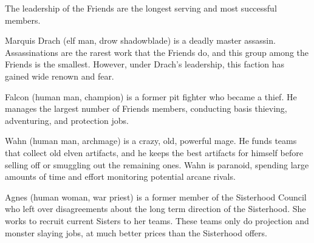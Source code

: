 The leadership of the Friends are the longest serving and most successful members.

Marquis Drach (elf man, drow shadowblade) is a deadly master assassin.
Assassinations are the rarest work that the Friends do, and this group among the Friends is the smallest.
However, under Drach's leadership, this faction has gained wide renown and fear.

Falcon (human man, champion) is a former pit fighter who became a thief.
He manages the largest number of Friends members, conducting basis thieving, adventuring, and protection jobs.

Wahn (human man, archmage) is a crazy, old, powerful mage.
He funds teams that collect old elven artifacts, and he keeps the best artifacts for himself before selling off or smuggling out the remaining ones.
Wahn is paranoid, spending large amounts of time and effort monitoring potential arcane rivals.

Agnes (human woman, war priest) is a former member of the Sisterhood Council who left over disagreements about the long term direction of the Sisterhood.
She works to recruit current Sisters to her teams.
These teams only do projection and monster slaying jobs, at much better prices than the Sisterhood offers.